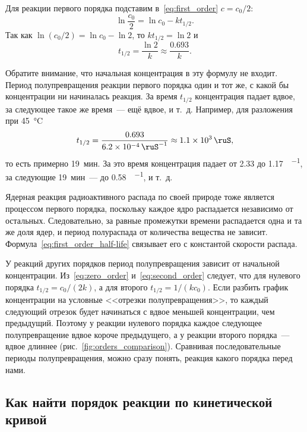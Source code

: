 Для реакции первого порядка подставим в~\eqref{eq:first_order} $c = c_0/2$:
\begin{equation*}
    \ln \frac{c_0}{2} = \ln c_0 - kt_{1/2}.
\end{equation*}
Так как $\ln (c_0/2) = \ln c_0 - \ln 2$, то $kt_{1/2} = \ln 2$ и
\begin{equation}
    \label{eq:first_order_half-life}
    \boxed{t_{1/2} = \frac{\ln 2}{k} \approx \frac{\num{0,693}}{k}}.
\end{equation}

Обратите внимание, что начальная концентрация в эту формулу не входит. Период полупревращения реакции первого порядка один и тот же, с какой бы концентрации ни начиналась реакция. За время $t_{1/2}$ концентрация падает вдвое, за следующее такое же время~--- ещё вдвое, и т.~д. Например, для разложения  при \qty{45}{\degreeCelsius}
\begin{equation*}
    t_{1/2} = \frac{\num{0,693}}{\qty{6,2e-4}{\ruS\tothe{-1}}} \approx \qty{1,1e3}{\ruS},
\end{equation*}
то есть примерно 19~мин. За это время концентрация  падает от \num{2,33} до \qty{1,17}{\ruMole\per\ruL}, за следующие 19~мин~--- до \qty{0,58}{\ruMole\per\ruL}, и т.~д.

Ядерная реакция радиоактивного распада по своей природе тоже является процессом первого порядка, поскольку каждое ядро распадается независимо от остальных. Следовательно, за равные промежутки времени распадается одна и та же доля ядер, и период полураспада от количества вещества не зависит. Формула~\eqref{eq:first_order_half-life} связывает его с константой скорости распада.

У реакций других порядков период полупревращения зависит от начальной концентрации. Из~\eqref{eq:zero_order} и~\eqref{eq:second_order} следует, что для нулевого порядка $t_{1/2} = c_0/(2k)$, а для второго $t_{1/2} = 1/(kc_0)$. Если разбить график концентрации на условные <<отрезки полупревращения>>, то каждый следующий отрезок будет начинаться с вдвое меньшей концентрации, чем предыдущий. Поэтому у реакции нулевого порядка каждое следующее полупревращение вдвое короче предыдущего, а у реакции второго порядка~--- вдвое длиннее (рис.~\ref{fig:orders_comparison}). Сравнивая последовательные периоды полупревращения, можно сразу понять, реакция какого порядка перед нами.

\subsection*{Как найти порядок реакции по кинетической кривой}

